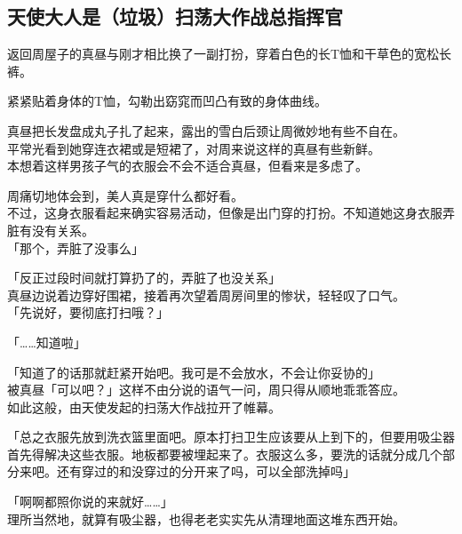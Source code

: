\subsection{天使大人是（垃圾）扫荡大作战总指挥官}

返回周屋子的真昼与刚才相比换了一副打扮，穿着白色的长T恤和干草色的宽松长裤。

紧紧贴着身体的T恤，勾勒出窈窕而凹凸有致的身体曲线。

真昼把长发盘成丸子扎了起来，露出的雪白后颈让周微妙地有些不自在。\\

平常光看到她穿连衣裙或是短裙了，对周来说这样的真昼有些新鲜。\\

本想着这样男孩子气的衣服会不会不适合真昼，但看来是多虑了。

周痛切地体会到，美人真是穿什么都好看。\\

不过，这身衣服看起来确实容易活动，但像是出门穿的打扮。不知道她这身衣服弄脏有没有关系。\\

「那个，弄脏了没事么」

「反正过段时间就打算扔了的，弄脏了也没关系」\\

真昼边说着边穿好围裙，接着再次望着周房间里的惨状，轻轻叹了口气。\\

「先说好，要彻底打扫哦？」

「……知道啦」

「知道了的话那就赶紧开始吧。我可是不会放水，不会让你妥协的」\\

被真昼「可以吧？」这样不由分说的语气一问，周只得从顺地乖乖答应。\\

如此这般，由天使发起的扫荡大作战拉开了帷幕。\\

\vspace{2\baselineskip}

「总之衣服先放到洗衣篮里面吧。原本打扫卫生应该要从上到下的，但要用吸尘器首先得解决这些衣服。地板都要被埋起来了。衣服这么多，要洗的话就分成几个部分来吧。还有穿过的和没穿过的分开来了吗，可以全部洗掉吗」

「啊啊都照你说的来就好……」\\

理所当然地，就算有吸尘器，也得老老实实先从清理地面这堆东西开始。\\

